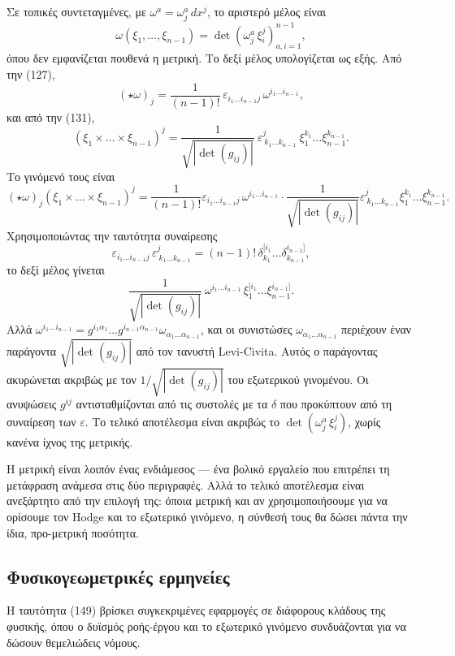 \documentclass[12pt]{article}
\begin{document}
Σε τοπικές συντεταγμένες, με $\omega^a = \omega^a_j \, dx^j$, το αριστερό μέλος είναι
\[
\omega(\xi_1, \dots, \xi_{n-1}) = \det \left( \omega^a_j \, \xi_i^j \right)_{a,i=1}^{n-1},
\]
όπου δεν εμφανίζεται πουθενά η μετρική. Το δεξί μέλος υπολογίζεται ως εξής. Από την (127),
\[
(\star \omega)_j = \frac{1}{(n-1)!} \, \varepsilon_{i_1 \dots i_{n-1} j} \, \omega^{i_1 \dots i_{n-1}},
\]
και από την (131),
\[
(\xi_1 \times \dots \times \xi_{n-1})^j = \frac{1}{\sqrt{|\det(g_{ij})|}} \ \varepsilon^{j}_{\ k_1 \dots k_{n-1}} \ \xi_1^{k_1} \dots \xi_{n-1}^{k_{n-1}}.
\]
Το γινόμενό τους είναι
\[
(\star \omega)_j (\xi_1 \times \dots \times \xi_{n-1})^j = \frac{1}{(n-1)!} \varepsilon_{i_1 \dots i_{n-1} j} \, \omega^{i_1 \dots i_{n-1}} \cdot \frac{1}{\sqrt{|\det(g_{ij})|}} \varepsilon^{j}_{\ k_1 \dots k_{n-1}} \xi_1^{k_1} \dots \xi_{n-1}^{k_{n-1}}.
\]
Χρησιμοποιώντας την ταυτότητα συναίρεσης
\[
\varepsilon_{i_1 \dots i_{n-1} j} \, \varepsilon^{j}_{\ k_1 \dots k_{n-1}} = (n-1)! \, \delta^{[i_1}_{k_1} \dots \delta^{i_{n-1}]}_{k_{n-1}},
\]
το δεξί μέλος γίνεται
\[
\frac{1}{\sqrt{|\det(g_{ij})|}} \ \omega^{i_1 \dots i_{n-1}} \, \xi_1^{[i_1} \dots \xi_{n-1}^{i_{n-1}]}.
\]
Αλλά $\omega^{i_1 \dots i_{n-1}} = g^{i_1 \alpha_1} \dots g^{i_{n-1} \alpha_{n-1}} \omega_{\alpha_1 \dots \alpha_{n-1}}$, και οι συνιστώσες $\omega_{\alpha_1 \dots \alpha_{n-1}}$ περιέχουν έναν παράγοντα $\sqrt{|\det(g_{ij})|}$ από τον τανυστή Levi-Civita. Αυτός ο παράγοντας ακυρώνεται ακριβώς με τον $1/\sqrt{|\det(g_{ij})|}$ του εξωτερικού γινομένου. Οι ανυψώσεις $g^{ij}$ αντισταθμίζονται από τις συστολές με τα $\delta$ που προκύπτουν από τη συναίρεση των $\varepsilon$. Το τελικό αποτέλεσμα είναι ακριβώς το $\det(\omega^a_j \, \xi_i^j)$, χωρίς κανένα ίχνος της μετρικής.

Η μετρική είναι λοιπόν ένας ενδιάμεσος — ένα βολικό εργαλείο που επιτρέπει τη μετάφραση ανάμεσα στις δύο περιγραφές. Αλλά το τελικό αποτέλεσμα είναι ανεξάρτητο από την επιλογή της: όποια μετρική και αν χρησιμοποιήσουμε για να ορίσουμε τον Hodge και το εξωτερικό γινόμενο, η σύνθεσή τους θα δώσει πάντα την ίδια, προ-μετρική ποσότητα.

\subsection{Φυσικογεωμετρικές ερμηνείες}

Η ταυτότητα (149) βρίσκει συγκεκριμένες εφαρμογές σε διάφορους κλάδους της φυσικής, όπου ο δυϊσμός ροής-έργου και το εξωτερικό γινόμενο συνδυάζονται για να δώσουν θεμελιώδεις νόμους.
\end{document}
